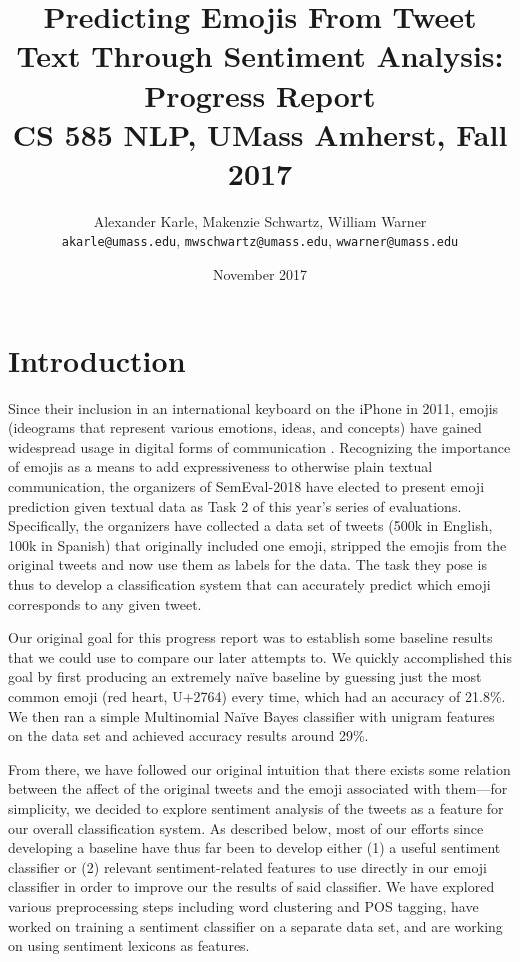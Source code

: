 \documentclass[10pt]{article}
\title{\textbf{Predicting Emojis From Tweet Text Through Sentiment Analysis: Progress Report} \\
\large CS 585 NLP, UMass Amherst, Fall 2017}
\author{
  Alexander Karle, Makenzie Schwartz, William Warner \\
  \texttt{akarle@umass.edu}, \texttt{mwschwartz@umass.edu}, \texttt{wwarner@umass.edu} }
\date{November 2017}
\begin{document}
\maketitle

\section{Introduction}
Since their inclusion in an international keyboard on the iPhone in 2011, emojis (ideograms that represent various emotions, ideas, and concepts) have gained widespread usage in digital forms of communication \cite{blagdon2013}. Recognizing the importance of emojis as a means to add expressiveness to otherwise plain textual communication, the organizers of SemEval-2018 have elected to present emoji prediction given textual data as Task 2 of this year's series of evaluations. Specifically, the organizers have collected a data set of tweets (500k in English, 100k in Spanish) that originally included one emoji, stripped the emojis from the original tweets and now use them as labels for the data. The task they pose is thus to develop a classification system that can accurately predict which emoji corresponds to any given tweet.

Our original goal for this progress report was to establish some baseline results that we could use to compare our later attempts to. We quickly accomplished this goal by first producing an extremely naïve baseline by guessing just the most common emoji (red heart, U+2764) every time, which had an accuracy of 21.8\%. We then ran a simple Multinomial Naïve Bayes classifier with unigram features on the data set and achieved accuracy results around 29\%.

From there, we have followed our original intuition that there exists some relation between the affect of the original tweets and the emoji associated with them—for simplicity, we decided to explore sentiment analysis of the tweets as a feature for our overall classification system. As described below, most of our efforts since developing a baseline have thus far been to develop either (1) a useful sentiment classifier or (2) relevant sentiment-related features to use directly in our emoji classifier in order to improve our the results of said classifier. We have explored various preprocessing steps including word clustering and POS tagging, have worked on training a sentiment classifier on a separate data set, and are working on using sentiment lexicons as features.
\end{document}
